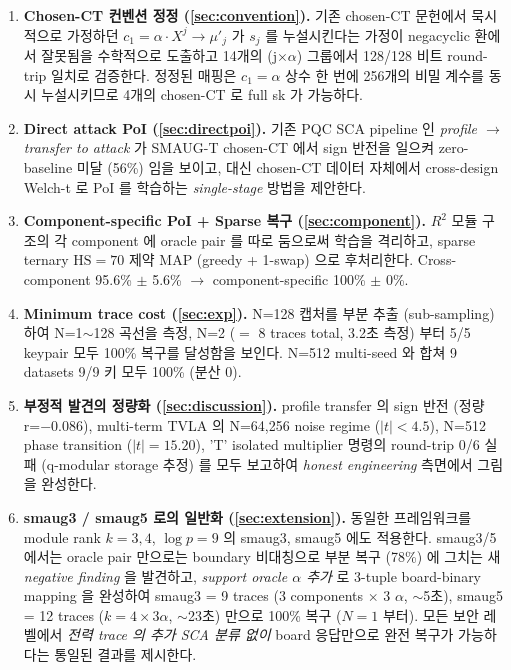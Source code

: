 \documentclass[11pt]{article}
\theoremstyle{plain}
\theoremstyle{definition}
\theoremstyle{remark}
\newcommand{\HS}{\mathrm{HS}}
\begin{document}
\begin{enumerate}[leftmargin=*]
\item \textbf{Chosen-CT 컨벤션 정정 (\cref{sec:convention}).}
   기존 chosen-CT 문헌에서 묵시적으로 가정하던 $c_1 = \alpha \cdot X^j \to
   \mu'_j$ 가 $s_j$ 를 누설시킨다는 가정이 negacyclic 환에서 잘못됨을
   수학적으로 도출하고 14개의 (j$\times\alpha$) 그룹에서 128/128 비트
   round-trip 일치로 검증한다. 정정된 매핑은 $c_1 = \alpha$ 상수 한 번에
   256개의 비밀 계수를 동시 누설시키므로 4개의 chosen-CT 로 full sk 가 가능하다.

\item \textbf{Direct attack PoI (\cref{sec:directpoi}).}
   기존 PQC SCA pipeline 인 \emph{profile $\to$ transfer to attack} 가
   SMAUG-T chosen-CT 에서 sign 반전을 일으켜 zero-baseline 미달 (56\%) 임을
   보이고, 대신 chosen-CT 데이터 자체에서 cross-design Welch-t 로 PoI 를
   학습하는 \emph{single-stage} 방법을 제안한다.

\item \textbf{Component-specific PoI + Sparse 복구 (\cref{sec:component}).}
   $R^2$ 모듈 구조의 각 component 에 oracle pair 를 따로 둠으로써 학습을
   격리하고, sparse ternary $\HS=70$ 제약 MAP (greedy + 1-swap) 으로 후처리한다.
   Cross-component 95.6\% $\pm$ 5.6\% $\to$ component-specific 100\% $\pm$ 0\%.

\item \textbf{Minimum trace cost (\cref{sec:exp}).}
   N=128 캡처를 부분 추출 (sub-sampling) 하여 N=1$\sim$128 곡선을 측정,
   N=2 ($=$ 8 traces total, 3.2초 측정) 부터 5/5 keypair 모두 100\%
   복구를 달성함을 보인다. N=512 multi-seed 와 합쳐 9 datasets 9/9 키 모두
   100\% (분산 0).

\item \textbf{부정적 발견의 정량화 (\cref{sec:discussion}).}
   profile transfer 의 sign 반전 (정량 r=$-0.086$), multi-term TVLA 의 N=64,256
   noise regime ($|t| < 4.5$), N=512 phase transition ($|t|=15.20$), 'T'
   isolated multiplier 명령의 round-trip 0/6 실패 (q-modular storage 추정) 를
   모두 보고하여 \emph{honest engineering} 측면에서 그림을 완성한다.

\item \textbf{smaug3 / smaug5 로의 일반화 (\cref{sec:extension}).}
   동일한 프레임워크를 module rank $k=3, 4$, $\log p = 9$ 의 smaug3, smaug5
   에도 적용한다. smaug3/5 에서는 oracle pair 만으로는 boundary 비대칭으로
   부분 복구 (78\%) 에 그치는 새 \emph{negative finding} 을 발견하고,
   \emph{support oracle $\alpha$ 추가} 로 3-tuple board-binary mapping 을
   완성하여 smaug3 = 9 traces (3 components $\times$ 3 $\alpha$, $\sim$5초),
   smaug5 = 12 traces ($k=4 \times 3 \alpha$, $\sim$23초) 만으로 100\% 복구
   ($N=1$ 부터). 모든 보안 레벨에서 \emph{전력 trace 의 추가 SCA 분류 없이}
   board 응답만으로 완전 복구가 가능하다는 통일된 결과를 제시한다.
\end{enumerate}
\end{document}
